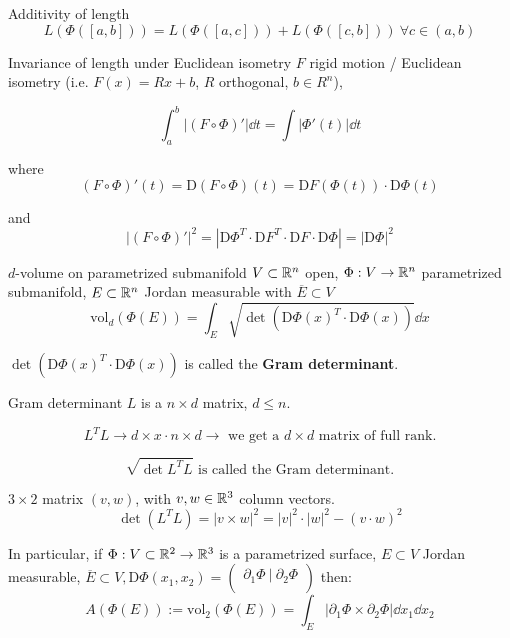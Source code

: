 \documentclass[12pt]{article}
\begin{document}
\begin{remark}{Additivity of length}{}
    $$
        L(\Phi([a, b])) = L(\Phi([a, c])) + L(\Phi([c, b])) \ \forall c \in (a, b)
    $$
\end{remark}

\begin{remark}{Invariance of length under Euclidean isometry}{}
    $F$ rigid motion / Euclidean isometry (i.e. $F(x) = Rx + b$, $R$ orthogonal, $b \in R^n$),

    $$
        \int_{a}^{b} \left|(F \circ \Phi)'\right| \dd t = \int \left|\Phi'(t)\right| \dd t
    $$

    where 
    $$
    (F \circ \Phi)'(t) = \mathrm{D}(F \circ \Phi)(t) = \mathrm{D}F(\Phi(t)) \cdot \mathrm{D}\Phi(t)
    $$

    and
    $$
        \left|(F \circ \Phi)'\right|^2 = \left|\mathrm{D}\Phi^T \cdot \mathrm{D}F^T \cdot \mathrm{D}F \cdot \mathrm{D}\Phi\right| = \left|\mathrm{D} \Phi\right|^2
    $$
\end{remark}

\begin{definition}{$d$-volume on parametrized submanifold}{}
    $V \subset \mathbb{R}^n$ open, $\Phi: V \rightarrow \mathbb{R}^n$ parametrized submanifold, $E \subset \mathbb{R}^n$ Jordan measurable with $\overline{E} \subset V$
    $$
        \mathrm{vol}_d(\Phi(E)) = \int_E \sqrt{\det(\mathrm{D} \Phi(x)^T \cdot \mathrm{D} \Phi(x))} \dd x
    $$

    $\det(\mathrm{D} \Phi(x)^T \cdot \mathrm{D} \Phi(x))$ is called the \textbf{Gram determinant}.
\end{definition}

\begin{remark}{Gram determinant}{}
    $L$ is a $n \times d$ matrix, $d \leq n$.

    $$
        L^T L \rightarrow d \times x \cdot n \times d \rightarrow \text{ we get a } d \times d \text{ matrix of full rank.}
    $$

    $$
        \sqrt{\det L^T L} \text{ is called the Gram determinant.}
    $$
\end{remark}

\begin{lemma}{}{}
    $3 \times 2$ matrix $(v, w)$, with $v, w \in \mathbb{R}^3$ column vectors.
    $$
        \det(L^T L) = \left|v \times w\right|^2 = \left|v\right|^2 \cdot \left|w\right|^2 - (v \cdot w)^2
    $$

    In particular, if $\Phi: V \subset \mathbb{R}^2 \rightarrow \mathbb{R}^3$ is a parametrized surface, $E \subset V$ Jordan measurable, $\overline{E} \subset V, \mathrm{D} \Phi(x_1, x_2) = \begin{pmatrix} \partial_1 \Phi\ \big|\ \partial_2 \Phi \\\end{pmatrix}$ then:
    $$
        A(\Phi(E)) := \mathrm{vol}_2(\Phi(E)) = \int_E \left|\partial_1 \Phi \times \partial_2\Phi\right|\dd x_1 \dd x_2
    $$
\end{lemma}
\end{document}
